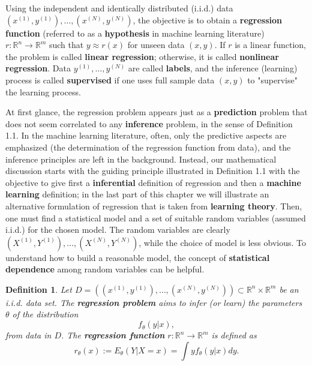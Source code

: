 \documentclass{report}
\newtheorem{definition}{Definition}[chapter]
\begin{document}
Using the independent and identically distributed (i.i.d.) data $(x^{(1)},y^{(1)}),\dots,(x^{(N)},y^{(N)})$, the objective is to obtain a \textbf{regression function} (referred to as a \textbf{hypothesis} in machine learning literature) $r : \mathbb{R}^n \to \mathbb{R}^m$ such that $y \approx r(x)$ for unseen data $(x,y)$. If $r$ is a linear function, the problem is called \textbf{linear regression}; otherwise, it is called \textbf{nonlinear regression}. Data $y^{(1)},\dots,y^{(N)}$ are called \textbf{labels}, and the inference (learning) process is called \textbf{supervised} if one uses full sample data $(x,y)$ to "supervise" the learning process.

At first glance, the regression problem appears just as a \textbf{prediction} problem that does not seem correlated to any \textbf{inference} problem, in the sense of Definition 1.1. In the machine learning literature, often, only the predictive aspects are emphasized (the determination of the regression function from data), and the inference principles are left in the background. Instead, our mathematical discussion starts with the guiding principle illustrated in Definition 1.1 with the objective to give first a \textbf{inferential } definition of regression and then a \textbf{machine learning} definition; in the last part of this chapter we will illustrate an alternative formulation of regression that is taken from \textbf{learning theory}. Then, one must
find a statistical model and a set of suitable random variables (assumed i.i.d.) for the chosen model. The random variables are clearly $(X^{(1)},Y^{(1)}),\dots,(X^{(N)},Y^{(N)})$, while the choice of model is less obvious. To understand how to build a reasonable model, the concept of \textbf{statistical dependence} among random variables can be helpful.


\begin{definition}
Let $D = ((x^{(1)},y^{(1)}),\dots,(x^{(N)},y^{(N)})) \subset \mathbb{R}^n \times \mathbb{R}^m$ be an i.i.d. data set. The \textbf{regression problem} aims to infer (or learn) the parameters $\theta$ of the distribution
\begin{equation}
f_\theta(y|x),
\end{equation}
from data in $D$. The \textbf{regression function} $r : \mathbb{R}^n \to \mathbb{R}^m$ is defined as
\begin{equation}
 r_\theta(x) := E_\theta(Y|X = x) = \int yf_\theta(y|x)dy.
\end{equation}
\end{definition}
\end{document}
